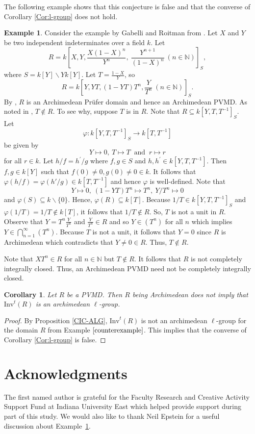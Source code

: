\documentclass[12pt]{amsart}
\newtheorem{corollary}[theorem]{Corollary}
\theoremstyle{definition}\newtheorem{remark}[theorem]{Remark}
\theoremstyle{definition}\newtheorem{definition}[theorem]{Definition}
\newtheorem{example}[theorem]{Example}
\begin{document}
The following example shows that this conjecture is false and that the converse of Corollary \ref{Cor:l-group} does not hold. 
\begin{example}\label{counterexample}
Consider the example by Gabelli and Roitman from \cite[Example 5.9]{Gabelli2020}. 
Let $X$ and $Y$ be two independent indeterminates over a field $k$. Let
$$R=k\left[X,Y,  \frac{X(1-X)^n}{Y^n}, \  \frac{Y^{n+1}}{(1-X)^n}\ (n \in \mathbb{N})\right]_S,$$
where $S=k[Y] \backslash Yk[Y]$.
Let $T=\frac{1-X}Y$, 
so
$$R=k\left[Y, YT, (1-YT)T^n, \frac Y{T^n}\ (n\in \mathbb{N})\right]_S.$$
By \cite[Example 5.9]{Gabelli2020}, $R$ is an Archimedean Pr\"{u}fer domain and hence an Archimedean PVMD. 
As noted in \cite[Example 5.9]{Gabelli2020}, $T\notin R$. To see why, suppose $T$ is in $R$. Note that $R \subseteq k[Y, T, T^{-1}]_S$. Let 
$$\varphi: k[Y, T, T^{-1}]_S \longrightarrow k[T, T^{-1}]$$
be given by $$Y \mapsto 0, \ T \mapsto T \ \text{ and } \ r \mapsto r$$ for all $r \in k$. Let $h/f = h^\prime/g$ where $f, g \in S$ and $h, h^\prime \in k[Y, T, T^{-1}]$. Then $f, g \in k[Y]$ such that $f(0) \neq 0, g(0) \neq 0 \in k$. It follows that $\varphi(h/f) =\varphi(h'/g) \in  k[T, T^{-1}]$ and hence $\varphi$ is well-defined. Note that  $$Y \mapsto 0, \ (1-YT)T^n \mapsto T^n, \ Y/T^n \mapsto 0$$ and $\varphi(S) \subseteq k\backslash \{0\}$. Hence, $\varphi(R) \subseteq k[T]$. Because $1/T \in k[Y, T, T^{-1}]_S$ and $\varphi(1/T) = 1/T \not\in k[T]$, it follows that $1/T \not \in R$. So, $T$ is not a unit in $R$. Observe that $Y = T^n\frac{Y}{T^n}$ and $\frac{Y}{T^n} \in R$ and so $Y \in (T^n)$ for all $n$ which implies $Y \in \bigcap\limits_{n=1}^\infty (T^n)$. 
Because $T$ is not a unit, it follows that $Y = 0$ since $R$ is Archimedean which contradicts that $Y \neq 0 \in R$. Thus, $T \not\in R$.


Note that $XT^n\in R$ for all $n\in \mathbb{N}$ but $T \not\in R$. It follows that $R$ is not completely integrally closed. 
Thus, an Archimedean PVMD need not be completely integrally closed. 
\end{example}

\begin{corollary}
    Let $R$ be a PVMD. Then $R$ being Archimedean does not imply that $\text{Inv}^t(R)$ is an archimedean $\ell$-group.
\end{corollary}
\begin{proof}
By Proposition \ref{CIC-ALG}, $\text{Inv}^t(R)$ is not an archimedean $\ell$-group for the domain $R$ from Example $\ref{counterexample}$. This implies that the converse of Corollary \ref{Cor:l-group} is false. 
\end{proof}
\section*{Acknowledgments}

The first named author is grateful for the Faculty Research and Creative Activity Support Fund at Indiana University East which helped provide support during part of this study. We would also like to thank Neil Epstein for a useful discussion about Example~\ref{counterexample}.





\end{document}
